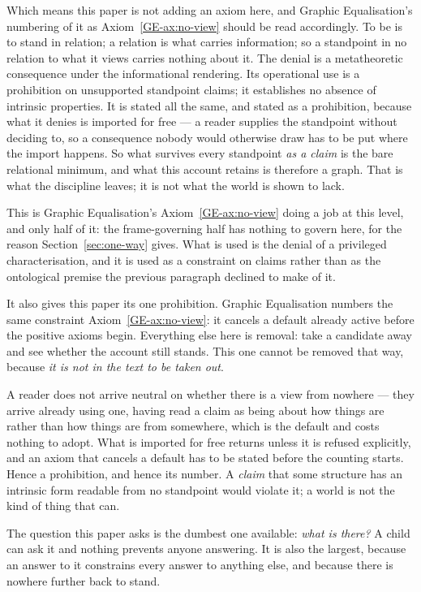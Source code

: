 \documentclass[11pt,a4paper]{article}
\theoremstyle{remark}\newtheorem{remark}[proposition]{Remark}
\begin{document}
Which means this paper is not adding an axiom here, and Graphic Equalisation's numbering of it as
Axiom~\ref{GE-ax:no-view} should be read accordingly. To be is to stand in relation; a relation is what carries
information; so a standpoint in no relation to what it views carries nothing about it. The denial
is a metatheoretic consequence under the informational rendering. Its operational use is a prohibition on unsupported standpoint claims; it establishes no absence of intrinsic properties. It is stated all the same, and
stated as a prohibition, because what it denies is imported for free --- a reader supplies the
standpoint without deciding to, so a consequence nobody would otherwise draw has to be put where the
import happens. So what survives every standpoint \emph{as a claim} is the bare relational
minimum, and what this account retains is therefore a graph. That is what the discipline leaves; it is
not what the world is shown to lack.

This is Graphic Equalisation's Axiom~\ref{GE-ax:no-view} doing a job at this level, and only half of it: the frame-governing
half has nothing to govern here, for the reason Section~\ref{sec:one-way} gives. What is used is the
denial of a privileged characterisation, and it is used as a constraint on claims rather than as the
ontological premise the previous paragraph declined to make of it.

It also gives this paper its one prohibition. Graphic Equalisation numbers the same constraint
Axiom~\ref{GE-ax:no-view}: it cancels a default already active before the positive axioms begin.
Everything else here is removal: take a candidate away and see whether the account still stands. This
one cannot be removed that way, because \emph{it is not in the text to be taken out}.

A reader does not arrive neutral on whether there is a view from nowhere --- they
arrive already using one, having read a claim as being about how things are rather than how things are
from somewhere, which is the default and costs nothing to adopt. What is imported for free returns
unless it is refused explicitly, and an axiom that cancels a default has to be stated before the
counting starts. Hence a prohibition, and hence its number. A \emph{claim} that some structure has an
intrinsic form readable from no standpoint would violate it; a world is not the kind of thing that
can.

The question this paper asks is the dumbest one available: \emph{what is there?} A child can ask it and
nothing prevents anyone answering. It is also the largest, because an answer to it constrains every
answer to anything else, and because there is nowhere further back to stand.
\end{document}
